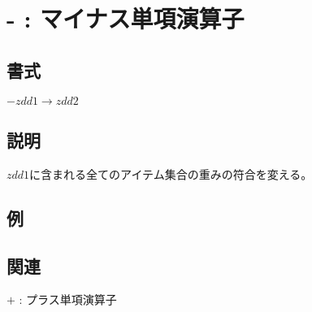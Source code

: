 
\section{- : マイナス単項演算子\label{sect:minus_op}}
\subsection*{書式}
$- zdd1 \rightarrow zdd2$

\subsection*{説明}
$zdd1$に含まれる全てのアイテム集合の重みの符合を変える。

\subsection*{例}


\subsection*{関連}
\hyperref[sect:plus_op]{$+$} : プラス単項演算子
